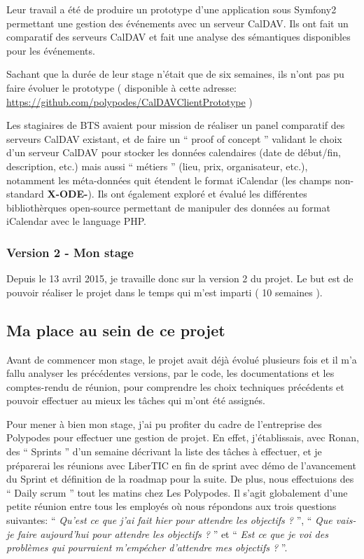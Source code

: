 Leur travail a été de produire un prototype d'une application sous Symfony2 permettant une gestion des événements avec un serveur CalDAV. Ils ont fait un comparatif des serveurs CalDAV et fait une analyse des sémantiques disponibles pour les événements.

Sachant que la durée de leur stage n'était que de six semaines, ils n'ont pas pu faire évoluer le prototype ( disponible à cette adresse: \url{https://github.com/polypodes/CalDAVClientPrototype} )

Les stagiaires de BTS avaient pour mission de réaliser un panel comparatif des serveurs CalDAV existant, et de faire un `` proof of concept '' validant le choix d'un serveur CalDAV pour stocker les données calendaires (date de début/fin, description, etc.) mais aussi `` métiers '' (lieu, prix, organisateur, etc.), notamment les méta-données quit étendent le format iCalendar (les champs non-standard \textbf{X-ODE-}). Ils ont également exploré et évalué les différentes bibliothèrques open-source permettant de manipuler des données au format iCalendar avec le language PHP.

\subsubsection*{Version 2 - Mon stage}

Depuis le 13 avril 2015, je travaille donc sur la version 2 du projet. Le but est de pouvoir réaliser le projet dans le temps qui m'est imparti ( 10 semaines ).

\subsection{Ma place au sein de ce projet}

Avant de commencer mon stage, le projet avait déjà évolué plusieurs fois et il m'a fallu analyser les précédentes versions, par le code, les documentations et les comptes-rendu de réunion, pour comprendre les choix techniques précédents et pouvoir effectuer au mieux les tâches qui m'ont été assignés.

Pour mener à bien mon stage, j'ai pu profiter du cadre de l'entreprise des Polypodes pour effectuer une gestion de projet. En effet, j'établissais, avec Ronan, des `` Sprints '' d'un semaine décrivant la liste des tâches à effectuer, et je préparerai les réunions avec LiberTIC en fin de sprint avec démo de l'avancement du Sprint et définition de la roadmap pour la suite. De plus, nous effectuions des `` Daily scrum '' tout les matins chez Les Polypodes. Il s'agit globalement d'une petite réunion entre tous les employés où nous répondons aux trois questions suivantes: `` \textit{Qu'est ce que j'ai fait hier pour attendre les objectifs ?} '', `` \textit{Que vais-je faire aujourd'hui pour attendre les objectifs ?} '' et `` \textit{Est ce que je voi des problèmes qui pourraient m'empécher d'attendre mes objectifs ?} ''.


